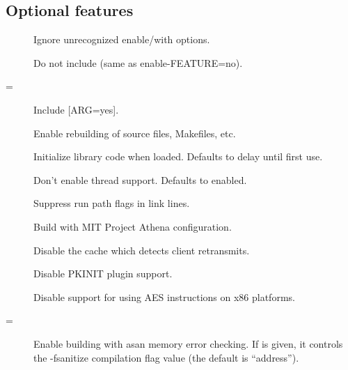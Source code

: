 \documentclass[letterpaper,10pt,english]{sphinxmanual}
\begin{document}
\subsection{Optional features}
\label{\detokenize{build/options2configure:optional-features}}\begin{description}
\item[{\sphinxstylestrong{-}}] \leavevmode
Ignore unrecognized \textendash{}enable/\textendash{}with options.

\item[{\sphinxstylestrong{-}}] \leavevmode
Do not include  (same as \textendash{}enable-FEATURE=no).

\item[{\sphinxstylestrong{-}\sphinxstyleemphasis{FEATURE}{[}=\sphinxstyleemphasis{ARG}{]}}] \leavevmode
Include  {[}ARG=yes{]}.

\item[{\sphinxstylestrong{-}}] \leavevmode
Enable rebuilding of source files, Makefiles, etc.

\item[{\sphinxstylestrong{-}}] \leavevmode
Initialize library code when loaded.  Defaults to delay until
first use.

\item[{\sphinxstylestrong{-}}] \leavevmode
Don’t enable thread support.  Defaults to enabled.

\item[{\sphinxstylestrong{-}}] \leavevmode
Suppress run path flags in link lines.

\item[{\sphinxstylestrong{-}}] \leavevmode
Build with MIT Project Athena configuration.

\item[{\sphinxstylestrong{-}}] \leavevmode
Disable the cache which detects client retransmits.

\item[{\sphinxstylestrong{-}}] \leavevmode
Disable PKINIT plugin support.

\item[{\sphinxstylestrong{-}}] \leavevmode
Disable support for using AES instructions on x86 platforms.

\item[{\sphinxstylestrong{-}\sphinxstylestrong{-enable-asan}{[}=\sphinxstyleemphasis{ARG}{]}}] \leavevmode
Enable building with asan memory error checking.  If  is
given, it controls the -fsanitize compilation flag value (the
default is “address”).

\end{description}
\end{document}
